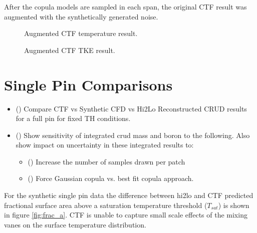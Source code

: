 After the copula models are sampled in each span, the original CTF result was augmented with the synthetically generated noise.


\begin{figure}[H]%
    \centering
    \qquad
    \caption[Augmented CFD result.]{Augmented CTF temperature result.}%
    \label{fig:ctf_twall_aug}%
\end{figure}

\begin{figure}[H]%
    \centering
    \qquad
    \caption[Augmented CFD TKE result.]{Augmented CTF TKE result.}%
    \label{fig:ctf_tke_aug}%
\end{figure}





\section{Single Pin Comparisons}


\begin{itemize}
	\item (\checkmark) Compare CTF vs Synthetic CFD vs Hi2Lo Reconstructed CRUD results for a full pin for fixed TH conditions.
	\item (\checkmark) Show sensitivity of integrated crud mass and boron to the following.  Also show impact on uncertainty in these integrated results to:
	\begin{itemize}
		\item (\checkmark) Increase the number of samples drawn per patch
		\item (\checkmark) Force Gaussian copula vs. best fit copula approach.
	\end{itemize}
\end{itemize}

For the synthetic single pin data the difference between hi2lo and CTF predicted fractional surface area above a saturation temperature threshold ($T_{sat}$) is shown in figure \ref{fig:frac_a}.   CTF
is unable to capture small scale effects of the mixing vanes on the surface temperature distribution.

